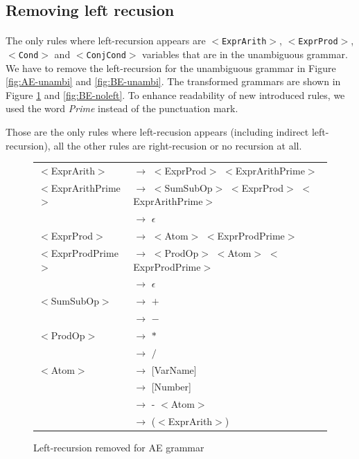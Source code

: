 \documentclass[letterpaper]{article}
\begin{document}
\subsection{Removing left recusion}
\paragraph{}

The only rules where left-recursion appears are \texttt{$<$ExprArith$>$},
\texttt{$<$ExprProd$>$}, \texttt{$<$Cond$>$} and \texttt{$<$ConjCond$>$}
variables
that are in the unambiguous grammar.
We have to remove the left-recursion for the unambiguous grammar
in Figure \ref{fig:AE-unambi} and \ref{fig:BE-unambi}. The transformed
grammars are shown in Figure \ref{fig:AE-noleft} and \ref{fig:BE-noleft}.
To enhance readability of new introduced rules,
we used the word \textit{Prime} instead of the punctuation mark.

Those are the only rules where left-recusion appears (including indirect
left-recursion), all the other rules
are right-recusion or no recursion at all.
\begin{figure}[H]
    \centering
    \begin{tabular}{l l}
        $<$ExprArith$>$ & $\rightarrow$
        $<$ExprProd$>$ $<$ExprArithPrime$>$ \\

        $<$ExprArithPrime$>$ & $\rightarrow$
        $<$SumSubOp$>$ $<$ExprProd$>$ $<$ExprArithPrime$>$ \\
         & $\rightarrow$ $\epsilon$\\


        $<$ExprProd$>$ & $\rightarrow$ $<$Atom$>$ $<$ExprProdPrime$>$\\

        $<$ExprProdPrime$>$ & $\rightarrow$
        $<$ProdOp$>$ $<$Atom$>$ $<$ExprProdPrime$>$\\
         & $\rightarrow$ $\epsilon$\\


        $<$SumSubOp$>$ & $\rightarrow$ $+$\\
         & $\rightarrow$ $-$\\

        $<$ProdOp$>$ & $\rightarrow$ $*$\\
         & $\rightarrow$ $/$\\

        $<$Atom$>$ & $\rightarrow$ [VarName]\\
         & $\rightarrow$ [Number]\\
         & $\rightarrow$ - $<$Atom$>$\\
         & $\rightarrow$ ($<$ExprArith$>$)\\

    \end{tabular}
    \caption{Left-recursion removed for AE grammar}
    \label{fig:AE-noleft}
\end{figure}
\end{document}
